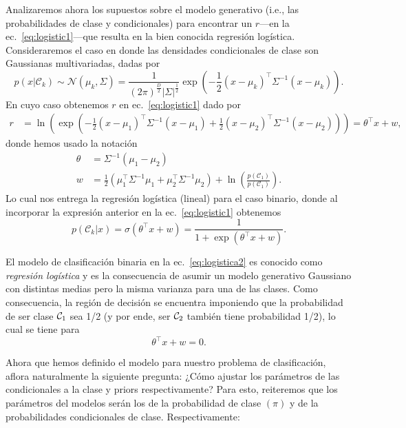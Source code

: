 Analizaremos ahora  los supuestos sobre el modelo generativo (i.e., las  probabilidades de clase y condicionales) para encontrar un $r$---en la ec.~\eqref{eq:logistic1}---que resulta en la bien conocida regresión logística. Consideraremos el caso en donde las densidades condicionales de clase son Gaussianas multivariadas, dadas por
\begin{equation}
	p(x|\mathcal{C}_k) \sim \mathcal{N} (\mu_k,\Sigma) = \frac{1}{(2\pi)^\frac{D}{2}|\Sigma|^\frac{1}{2}}\exp(-\frac{1}{2}(x-\mu_k)^\top \Sigma^{-1}(x-\mu_k)).
\end{equation}
En cuyo caso obtenemos $r$ en ec.~\eqref{eq:logistic1}  dado por
\begin{align}
r &= \ln(\exp(-\frac{1}{2}(x-\mu_1)^\top \Sigma^{-1}(x-\mu_1) +\frac{1}{2}(x-\mu_2)^\top \Sigma^{-1}(x-\mu_2)))= \theta^\top x+w,
\end{align}
donde hemos usado la notación
\begin{align}
\theta &= \Sigma^{-1}(\mu_1-\mu_2)\\
w &= \frac{1}{2}(\mu_1^\top \Sigma^{-1}\mu_1+\mu_2^\top \Sigma^{-1}\mu_2)
+\ln\left(\frac{p(\mathcal{C}_1)}{p(\mathcal{C}_1)}\right). 
\end{align}
Lo cual nos entrega la regresión logística (lineal) para el  caso binario, donde al incorporar la expresión anterior en la ec.~\eqref{eq:logistic1} obtenemos
\begin{equation}
	p(\mathcal{C}_k|x) = \sigma(\theta^\top x+w) = \frac{1}{1 + \exp{\left(\theta^\top x+w\right)}}. \label{eq:logistica2}
\end{equation}

\begin{remark}\label{rem:reg_log} 
El modelo de clasificación binaria en la  ec.~\ref{eq:logistica2} es conocido como \emph{regresión logística} y es la consecuencia de asumir un modelo generativo Gaussiano con distintas medias pero la misma varianza para una de las clases. Como consecuencia, la región de decisión se encuentra imponiendo que la probabilidad de ser clase ${\mathcal C}_1$ sea 1/2 (y por ende, ser ${\mathcal C}_2$ también tiene probabilidad 1/2), lo cual se tiene para 
\begin{equation}
	\theta^\top x+w = 0.
\end{equation}
\end{remark}

Ahora que hemos definido el modelo para nuestro problema de clasificación, aflora naturalmente la siguiente pregunta: ¿Cómo ajustar los parámetros de las condicionales a la clase y priors respectivamente? Para esto, reiteremos que los parámetros del modelos serán los de la probabilidad de clase $(\pi)$ y de la probabilidades condicionales de clase. Respectivamente: 

